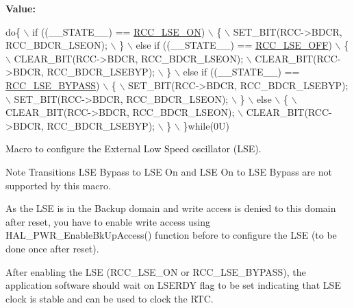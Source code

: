 {\bfseries Value\+:}
\begin{DoxyCode}
\textcolor{keywordflow}{do}\{                                                     \(\backslash\)
                      if ((\_\_STATE\_\_) == \hyperlink{group___r_c_c___l_s_e___config_gac981ea636c2f215e4473901e0912f55a}{RCC\_LSE\_ON})                        \(\backslash\)
                      \{                                                     \(\backslash\)
                        SET\_BIT(RCC->BDCR, RCC\_BDCR\_LSEON);                   \(\backslash\)
                      \}                                                     \(\backslash\)
                      else \textcolor{keywordflow}{if} ((\_\_STATE\_\_) == \hyperlink{group___r_c_c___l_s_e___config_ga6645c27708d0cad1a4ab61d2abb24c77}{RCC\_LSE\_OFF})                  \(\backslash\)
                      \{                                                     \(\backslash\)
                        CLEAR\_BIT(RCC->BDCR, RCC\_BDCR\_LSEON);                 \(\backslash\)
                        CLEAR\_BIT(RCC->BDCR, RCC\_BDCR\_LSEBYP);                \(\backslash\)
                      \}                                                     \(\backslash\)
                      else \textcolor{keywordflow}{if} ((\_\_STATE\_\_) == \hyperlink{group___r_c_c___l_s_e___config_gaad580157edbae878edbcc83c5a68e767}{RCC\_LSE\_BYPASS})               \(\backslash\)
                      \{                                                     \(\backslash\)
                        SET\_BIT(RCC->BDCR, RCC\_BDCR\_LSEBYP);                  \(\backslash\)
                        SET\_BIT(RCC->BDCR, RCC\_BDCR\_LSEON);                   \(\backslash\)
                      \}                                                     \(\backslash\)
                      else                                                  \(\backslash\)
                      \{                                                     \(\backslash\)
                        CLEAR\_BIT(RCC->BDCR, RCC\_BDCR\_LSEON);                 \(\backslash\)
                        CLEAR\_BIT(RCC->BDCR, RCC\_BDCR\_LSEBYP);                \(\backslash\)
                      \}                                                     \(\backslash\)
                    \}\textcolor{keywordflow}{while}(0U)
\end{DoxyCode}


Macro to configure the External Low Speed oscillator (L\+SE). 

\begin{DoxyNote}{Note}
Transitions L\+SE Bypass to L\+SE On and L\+SE On to L\+SE Bypass are not supported by this macro. 

As the L\+SE is in the Backup domain and write access is denied to this domain after reset, you have to enable write access using H\+A\+L\+\_\+\+P\+W\+R\+\_\+\+Enable\+Bk\+Up\+Access() function before to configure the L\+SE (to be done once after reset). 

After enabling the L\+SE (R\+C\+C\+\_\+\+L\+S\+E\+\_\+\+ON or R\+C\+C\+\_\+\+L\+S\+E\+\_\+\+B\+Y\+P\+A\+SS), the application software should wait on L\+S\+E\+R\+DY flag to be set indicating that L\+SE clock is stable and can be used to clock the R\+TC. 
\end{DoxyNote}

